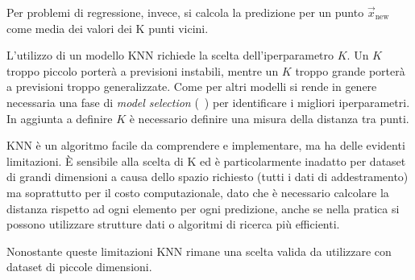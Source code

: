 Per problemi di regressione, invece, si calcola la predizione per un punto $\Vec{x}_\text{new}$ come media dei valori dei K punti vicini.

L'utilizzo di un modello KNN richiede la scelta dell'iperparametro $K$.
Un $K$ troppo piccolo porterà a previsioni instabili, mentre un $K$ troppo grande porterà a previsioni troppo generalizzate. 
Come per altri modelli si rende in genere necessaria una fase di \emph{model selection} (~) per identificare i migliori iperparametri. 
In aggiunta a definire $K$ è necessario definire una misura della distanza tra punti.

KNN è un algoritmo facile da comprendere e implementare, ma ha delle evidenti limitazioni. 
\`E sensibile alla scelta di K ed è particolarmente inadatto per dataset di grandi dimensioni a causa dello spazio richiesto (tutti i dati di addestramento) ma soprattutto per il costo computazionale, dato che è necessario calcolare la distanza rispetto ad ogni elemento per ogni predizione, anche se nella pratica si possono utilizzare strutture dati o algoritmi di ricerca più efficienti.

Nonostante queste limitazioni KNN rimane una scelta valida da utilizzare con dataset di piccole dimensioni.

